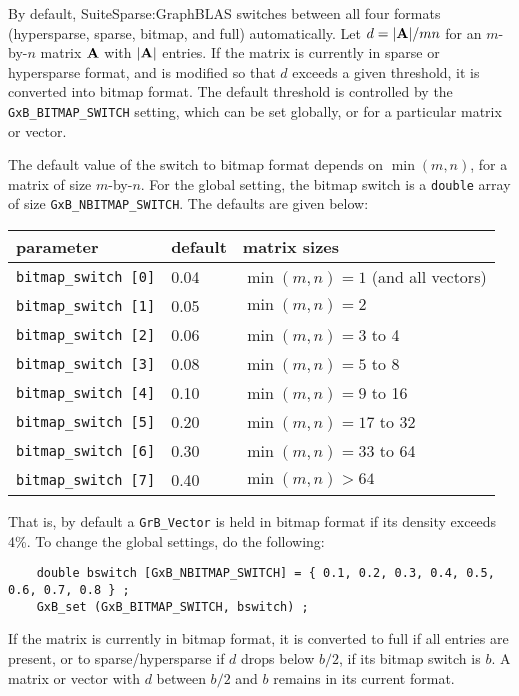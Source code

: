 \documentclass[12pt]{article}
\begin{document}
By default, SuiteSparse:GraphBLAS switches between all four formats
(hypersparse, sparse, bitmap, and full) automatically.  Let $d = |{\bf A}|/mn$
for an $m$-by-$n$ matrix $\bf A$ with $|{\bf A}|$ entries.  If the matrix is
currently in sparse or hypersparse format, and is modified so that $d$ exceeds
a given threshold, it is converted into bitmap format.  The default threshold
is controlled by the \verb'GxB_BITMAP_SWITCH' setting, which can be set
globally, or for a particular matrix or vector.

The default value of the switch to bitmap format depends on $\min(m,n)$, for a
matrix of size $m$-by-$n$.  For the global setting, the bitmap switch is a
\verb'double' array of size \verb'GxB_NBITMAP_SWITCH'.  The defaults are given
below:

\vspace{0.2in}
{\small
\begin{tabular}{lll}
parameter & default & matrix sizes \\
\hline
\verb'bitmap_switch [0]' & 0.04 & $\min(m,n) = 1$ (and all vectors) \\
\verb'bitmap_switch [1]' & 0.05 & $\min(m,n) = 2$ \\
\verb'bitmap_switch [2]' & 0.06 & $\min(m,n) = 3$ to 4 \\
\verb'bitmap_switch [3]' & 0.08 & $\min(m,n) = 5$ to 8 \\
\verb'bitmap_switch [4]' & 0.10 & $\min(m,n) = 9$ to 16\\
\verb'bitmap_switch [5]' & 0.20 & $\min(m,n) = 17$ to 32\\
\verb'bitmap_switch [6]' & 0.30 & $\min(m,n) = 33$ to 64 \\
\verb'bitmap_switch [7]' & 0.40 & $\min(m,n) > 64$ \\
\end{tabular}
}
\vspace{0.2in}

That is, by default a \verb'GrB_Vector' is held in bitmap format if its density
exceeds 4\%.  To change the global settings, do the following:

{\footnotesize
\begin{verbatim}
    double bswitch [GxB_NBITMAP_SWITCH] = { 0.1, 0.2, 0.3, 0.4, 0.5, 0.6, 0.7, 0.8 } ;
    GxB_set (GxB_BITMAP_SWITCH, bswitch) ;
\end{verbatim}
}

If the matrix is currently in bitmap format, it is converted to full if all
entries are present, or to sparse/hypersparse if $d$ drops below $b/2$, if its
bitmap switch is $b$.  A matrix or vector with $d$ between $b/2$ and $b$
remains in its current format.
\end{document}
